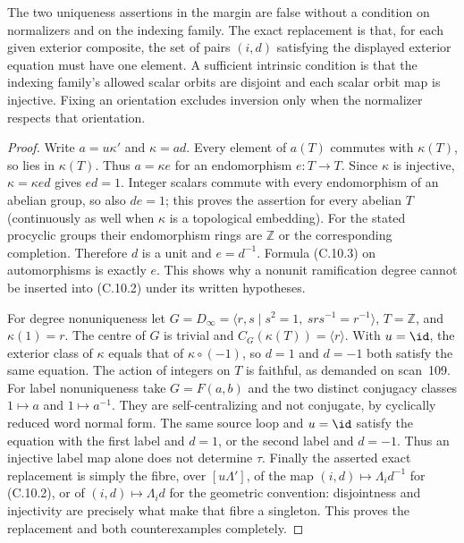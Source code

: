The two uniqueness assertions in
the margin are false without a
condition on normalizers and on
the indexing family. The exact
replacement is that, for each
given exterior composite, the
set of pairs $(i,d)$ satisfying
the displayed exterior equation
must have one element. A sufficient
intrinsic condition is that the
indexing family's allowed scalar
orbits are disjoint and each scalar
orbit map is injective. Fixing an
orientation excludes inversion
only when the normalizer respects
that orientation.

\begin{proof}
Write $a=u\kappa'$ and $\kappa=ad$.
Every element of $a(T)$ commutes
with $\kappa(T)$, so lies in
$\kappa(T)$. Thus $a=\kappa e$
for an endomorphism $e:T\to T$.
Since $\kappa$ is injective,
$\kappa=\kappa ed$ gives $ed=1$.
Integer scalars commute with every endomorphism of an
abelian group, so also $de=1$; this proves the assertion
for every abelian $T$ (continuously as well when $\kappa$
is a topological embedding). For the stated procyclic groups
their endomorphism rings are
$\mathbb Z$ or the corresponding
completion. Therefore $d$ is a
unit and $e=d^{-1}$. Formula
(C.10.3) on automorphisms is
exactly $e$. This shows why a
nonunit ramification degree cannot
be inserted into (C.10.2) under
its written hypotheses.

For degree nonuniqueness let
$G=D_\infty=\langle r,s\mid
s^2=1,\ srs^{-1}=r^{-1}\rangle$,
$T=\mathbb Z$, and $\kappa(1)=r$.
The centre of $G$ is trivial and
$C_G(\kappa(T))=\langle r\rangle$.
With $u=\id$, the exterior class
of $\kappa$ equals that of
$\kappa\circ(-1)$, so $d=1$ and
$d=-1$ both satisfy the same
equation. The action of integers
on $T$ is faithful, as demanded
on scan~109. For label
nonuniqueness take $G=F(a,b)$
and the two distinct conjugacy
classes $1\mapsto a$ and
$1\mapsto a^{-1}$. They are
self-centralizing and not
conjugate, by cyclically reduced
word normal form. The same
source loop and $u=\id$ satisfy
the equation with the first
label and $d=1$, or the second
label and $d=-1$. Thus an
injective label map alone does
not determine $\tau$. Finally
the asserted exact replacement
is simply the fibre, over $[u\Lambda']$, of the map
$(i,d)\mapsto\Lambda_i d^{-1}$ for (C.10.2),
or of $(i,d)\mapsto\Lambda_i d$ for the geometric convention:
disjointness and injectivity
are precisely what make that
fibre a singleton. This proves
the replacement and both
counterexamples completely.
\end{proof}

